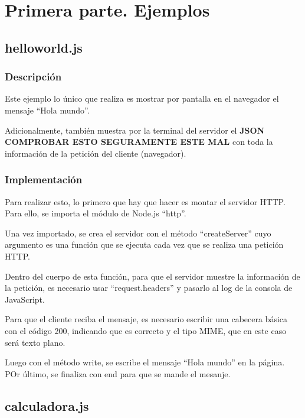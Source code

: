 \documentclass{article}
\begin{document}


\section{Primera parte. Ejemplos}
\subsection{helloworld.js}
\subsubsection{Descripción}
Este ejemplo lo único que realiza es mostrar por pantalla en el navegador el mensaje ``Hola mundo''.

Adicionalmente, también muestra por la terminal del servidor el \textbf{JSON COMPROBAR ESTO SEGURAMENTE ESTE MAL} con toda la información de la petición del cliente (navegador).


\subsubsection{Implementación}
Para realizar esto, lo primero que hay que hacer es montar el servidor HTTP. Para ello, se importa el módulo de Node.js ``http''.

Una vez importado, se crea el servidor con el método ``createServer'' cuyo argumento es una función que se ejecuta cada vez que se realiza una petición HTTP.

Dentro del cuerpo de esta función, para que el servidor muestre la información de la petición, es necesario usar ``request.headers'' y pasarlo al log de la consola de JavaScript.

Para que el cliente reciba el mensaje, es necesario escribir una cabecera básica con el código 200, indicando que es correcto y el tipo MIME, que en este caso será texto plano.

Luego con el método write, se escribe el mensaje ``Hola mundo'' en la página. POr último, se finaliza con end para que se mande el mesanje. %


\subsection{calculadora.js}
\end{document}
